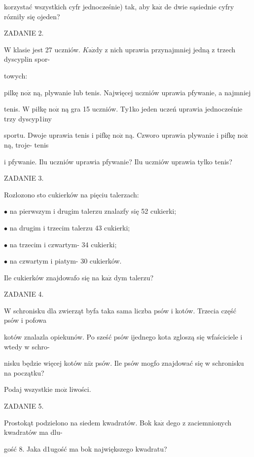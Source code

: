 \documentclass[a4paper,12pt]{article}
\begin{document}
korzystać wszystkich cyfr jednocześnie) tak, aby $\mathrm{k}\mathrm{a}\dot{\mathrm{z}}$ de dwie sąsiednie cyfry rózniły się ojeden?

ZADANIE 2.

$\mathrm{W}$ klasie jest 27 uczniów. $K\mathrm{a}\dot{\mathrm{z}}\mathrm{d}\mathrm{y}$ z nich uprawia przynajmniej jedną z trzech dyscyplin spor-

towych:

pilkę $\mathrm{n}\mathrm{o}\dot{\mathrm{z}}$ ną, plywanie lub tenis. Najwięcej uczniów uprawia pfywanie, a najmniej

tenis. $\mathrm{W}$ piłkę $\mathrm{n}\mathrm{o}\dot{\mathrm{z}}$ ną gra 15 uczniów. Ty1ko jeden uczeń uprawia jednocześnie trzy dyscyp1iny

sportu. Dwoje uprawia tenis i pifkę $\mathrm{n}\mathrm{o}\dot{\mathrm{z}}$ ną. Czworo uprawia plywanie i pifkę $\mathrm{n}\mathrm{o}\dot{\mathrm{z}}$ ną, troje- tenis

i pfywanie. Ilu uczniów uprawia pfywanie? Ilu uczniów uprawia tylko tenis?

ZADANIE 3.

Rozlozono sto cukierków na pięciu talerzach:

$\bullet$ na pierwszym i drugim talerzu znalazfy się 52 cukierki;

$\bullet$ na drugim i trzecim talerzu 43 cukierki;

$\bullet$ na trzecim i czwartym- 34 cukierki;

$\bullet$ na czwartym i piatym- 30 cukierków.

Ile cukierków znajdowafo się na $\mathrm{k}\mathrm{a}\dot{\mathrm{z}}$ dym talerzu?

ZADANIE 4.

$\mathrm{W}$ schronisku dla zwierząt byfa taka sama liczba psów i kotów. Trzecia część psów i pofowa

kotów znalazla opiekunów. Po sześć psów ijednego kota zgloszą się wfaściciele i wtedy w schro-

nisku będzie więcej kotów $\mathrm{n}\mathrm{i}\dot{\mathrm{z}}$ psów. Ile psów mogfo znajdować się w schronisku na początku?

Podaj wszystkie $\mathrm{m}\mathrm{o}\dot{\mathrm{z}}$ liwości.

ZADANIE 5.

Prostokąt podzielono na siedem kwadratów. Bok $\mathrm{k}\mathrm{a}\dot{\mathrm{z}}$ dego z zaciemnionych kwadratów ma dlu-

gość 8. Jaka d1ugość ma bok największego kwadratu?
\end{document}
